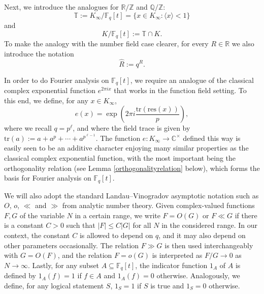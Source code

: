 \documentclass{article}
\theoremstyle{definition}
\theoremstyle{definition}
\theoremstyle{remark}
\newcommand{\R}{\mathbb{R}}
\newcommand{\Z}{\mathbb{Z}}
\newcommand{\C}{\mathbb{C}}
\newcommand{\F}{\mathbb{F}_q[t]}
\newcommand{\tr}{\text{tr}}
\newcommand{\1}{\mathbf{1}}
\numberwithin{equation}{section}
\begin{document}
Next, we introduce the analogues for $\R\slash \Z$ and $\mathbb{Q}\slash \Z$:
\[\mathbb{T}:=K_\infty \slash \F=\{x\in K_\infty: \langle x \rangle <1\}\]
and 
\[K\slash \F:=\mathbb{T}\cap K.\]
To make the analogy with the number field case clearer, for every $R\in \R$ we also introduce the notation 
\[\widehat{R}:=q^R.\]

In order to do Fourier analysis on $\F$, we require an analogue of the classical complex exponential function $e^{2\pi i x}$ that works in the function field setting. To this end, we define, for any $x\in K_\infty$, 
\[e(x)=\exp\left(2\pi i\frac{\text{tr}(\text{res}(x))}{p}\right),\]
where we recall $q=p^\ell$, and where the field trace is given by $\tr(a):=a+a^p+\cdots +a^{p^{\ell-1}}$. The function $e\colon K_\infty\to\C^{\times}$ defined this way is easily seen to be an additive character enjoying many similar properties as the classical complex exponential function, with the most important being the orthogonality relation (see Lemma \ref{orthogonalityrelation} below), which forms the basis for Fourier analysis on $\F$.

We will also adopt the standard Landau--Vinogradov asymptotic notation such as $O$, $o$, $\ll$ and $\gg$ from analytic number theory. Given complex-valued functions $F,G$ of the variable $N$ in a certain range, we write $F=O(G)$ or $F\ll G$ if there is a constant $C>0$ such that $|F|\le C|G|$ for all $N$ in the considered range. In our context, the constant $C$ is allowed to depend on $q$, and it may also depend on other parameters occasionally. The relation $F\gg G$ is then used interchangeably with $G=O(F)$, and the relation $F=o(G)$ is interpreted as $F/G\to0$ as $N\to\infty$. Lastly, for any subset $A\subseteq\F$, the indicator function $1_{A}$ of $A$ is defined by $1_{A}(f)=1$ if $f\in A$ and $1_{A}(f)=0$ otherwise. Analogously, we define, for any logical statement $S$, $1_{S}=1$ if $S$ is true and $1_{S}=0$ otherwise.
\end{document}
